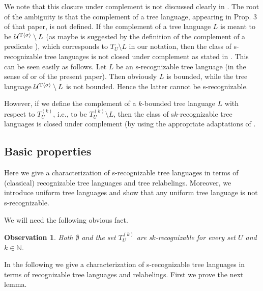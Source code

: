 \documentclass[10pt]{scrartcl}
\newtheorem{ob}[df]{Observation}
\newcommand{\nat}{\mathbb{N}}
\begin{document}
We note that this closure under complement is not discussed clearly in \cite{veabjo11a}. The root of the ambiguity is that the complement of a tree language, appearing in Prop. 3 of that paper, is not defined. If the complement of a tree language $L$ is meant to be ${\cal U}^{\mathrm{T}\langle\sigma\rangle} \setminus L$ (as maybe is suggested by the definition of the complement of a predicate \cite[p.146]{veabjo11a}), which corresponds to $T_U \setminus L$ in our notation, then 
the class of s-recognizable tree languages is not closed under complement as stated in \cite[Prop. 3, Thm. 1]{veabjo11a}. This can be seen easily as follows. Let $L$ be an  s-recognizable tree language (in the sense of \cite{veabjo11a} or of the present paper). Then obviously $L$ is bounded, while  the tree language ${\cal U}^{\mathrm{T}\langle\sigma\rangle} \setminus L$
is not bounded. Hence the latter cannot be s-recognizable. 

However, if we define the complement of a $k$-bounded tree language $L$ with respect to $T_U^{(k)}$, i.e., to be $T_U^{(k)} \setminus L$,
then the class of s$k$-recognizable tree languages is closed under complement (by using the appropriate adaptations of \cite[Prop. 3, Thm. 1]{veabjo11a}.



\subsection{Basic properties}


Here we give a characterization of s-recognizable tree languages in terms of (classical) recognizable tree languages and tree relabelings. Moreover, we introduce uniform tree languages and show that any uniform tree language is not s-recognizable. 

We will need the following obvious fact.


\begin{ob}\rm \label{ob:TU-k-rec} Both $\emptyset$ and the set $T_U^{(k)}$ are s$k$-recognizable
for every set $U$ and $k \in \nat$.
\end{ob}


In the following we give a characterization of s-recognizable tree languages in terms of recognizable tree languages and relabelings. First we prove the next lemma.
\end{document}
